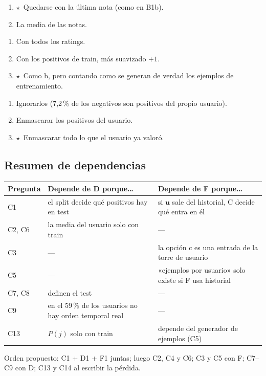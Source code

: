 \documentclass[a4paper,11pt]{article}
\newcommand{\rec}{\ensuremath{\star}}
\begin{document}
\begin{enumerate}[label=\alph*)]
  \item \rec\ Quedarse con la última nota (como en B1b).
  \item La media de las notas.
\end{enumerate}

\begin{enumerate}[label=\alph*)]
  \item Con todos los ratings.
  \item Con los positivos de train, más suavizado $+1$.
  \item \rec\ Como b, pero contando como se generan de verdad los ejemplos de entrenamiento.
\end{enumerate}

\begin{enumerate}[label=\alph*)]
  \item Ignorarlos (7,2\,\% de los negativos son positivos del propio usuario).
  \item Enmascarar los positivos del usuario.
  \item \rec\ Enmascarar todo lo que el usuario ya valoró.
\end{enumerate}

\subsection*{Resumen de dependencias}
\begin{center}
\small
\begin{tabularx}{\linewidth}{lYY}
\toprule
Pregunta & Depende de D porque\dots & Depende de F porque\dots \\
\midrule
C1 & el split decide qué positivos hay en test & si $\mathbf{u}$ sale del historial, C decide qué entra en él \\
C2, C6 & la media del usuario solo con train & --- \\
C3 & --- & la opción c es una entrada de la torre de usuario \\
C5 & --- & «ejemplos por usuario» solo existe si F usa historial \\
C7, C8 & definen el test & --- \\
C9 & en el 59\,\% de los usuarios no hay orden temporal real & --- \\
C13 & $P(j)$ solo con train & depende del generador de ejemplos (C5) \\
\bottomrule
\end{tabularx}
\end{center}
Orden propuesto: C1 + D1 + F1 juntas; luego C2, C4 y C6; C3 y C5 con F; C7--C9 con D; C13 y C14 al escribir la pérdida.
\end{document}
